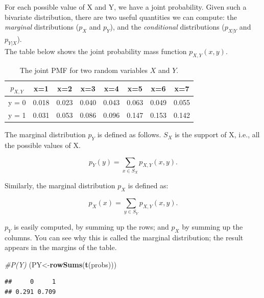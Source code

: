 \documentclass[12pt,]{krantz}
\newenvironment{Shaded}{\begin{snugshade}}{\end{snugshade}}
\newcommand{\CommentTok}[1]{\textcolor[rgb]{0.56,0.35,0.01}{\textit{#1}}}
\newcommand{\KeywordTok}[1]{\textcolor[rgb]{0.13,0.29,0.53}{\textbf{#1}}}
\newcommand{\NormalTok}[1]{#1}
\theoremstyle{definition}
\theoremstyle{definition}
\theoremstyle{definition}
\theoremstyle{remark}
\begin{document}
For each possible value of X and Y, we have a joint probability. Given such a bivariate distribution, there are two useful quantities we can compute: the \emph{marginal} distributions (\(p_{X}\) and \(p_Y\)), and the \emph{conditional} distributions (\(p_{X|Y}\) and \(p_{Y|X}\)).\\
The table below shows the joint probability mass function \(p_{X,Y}(x,y)\).

\begin{table}[!htbp] 
\begin{center}
\begin{tabular}{c|ccccccc}
$p_{X,Y}$ & x=1 & x=2 & x=3 & x=4 & x=5 & x=6 & x=7\\
\hline
y = 0 & 0.018 & 0.023 & 0.040 & 0.043 & 0.063 & 0.049 & 0.055\\
y = 1 & 0.031 & 0.053 & 0.086 & 0.096 &  0.147 & 0.153 &  0.142\\
\end{tabular}
\end{center}
\caption{The joint PMF for two random variables $X$ and $Y$.}\label{discretebivartable}
\end{table}

The marginal distribution \(p_Y\) is defined as follows. \(S_{X}\) is the support of X, i.e., all the possible values of X.

\begin{equation}
p_{Y}(y)=\sum_{x\in S_{X}}p_{X,Y}(x,y).\label{eq-marginal-pmf}
\end{equation}

Similarly, the marginal distribution \(p_X\) is defined as:

\begin{equation}
p_{X}(x)=\sum_{y\in S_{Y}}p_{X,Y}(x,y).\label{eq-marginal-pmf2}
\end{equation}

\(p_Y\) is easily computed, by summing up the rows; and \(p_X\) by summing up the columns. You can see why this is called the marginal distribution; the result appears in the margins of the table.

\begin{Shaded}
\begin{Highlighting}[]
\CommentTok{#P(Y)}
\NormalTok{(PY<-}\KeywordTok{rowSums}\NormalTok{(}\KeywordTok{t}\NormalTok{(probs)))}
\end{Highlighting}
\end{Shaded}

\begin{verbatim}
##     0     1 
## 0.291 0.709
\end{verbatim}
\end{document}
